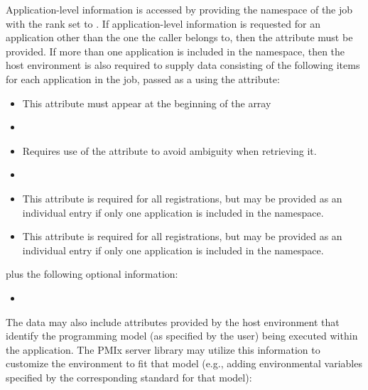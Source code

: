 Application-level information is accessed by providing the namespace of the job with the rank set to . If application-level information is requested for an application other than the one the caller belongs to, then the  attribute must be provided. If more than one application is included in the namespace, then the host environment is also required to supply data consisting of the following items for each application in the job, passed as a  using the  attribute:

\begin{itemize}
    \item {}This attribute must appear at the beginning of the array
    \pasteAttributeItemEnd
    \item {}
    \item {}Requires use of the  attribute to avoid ambiguity when retrieving it.
    \pasteAttributeItemEnd
    \item {}
    \item {}This attribute is required for all registrations, but may be provided as an individual  entry if only one application is included in the namespace.
    \pasteAttributeItemEnd
    \item {}This attribute is required for all registrations, but may be provided as an individual  entry if only one application is included in the namespace.
    \pasteAttributeItemEnd
\end{itemize}

plus the following optional information:

\begin{itemize}
    \item {}
\end{itemize}

The data may also include attributes provided by the host environment that identify the programming model (as specified by the user) being executed within the application. The \ac{PMIx} server library may utilize this information to customize the environment to fit that model (e.g., adding environmental variables specified by the corresponding standard for that model):

